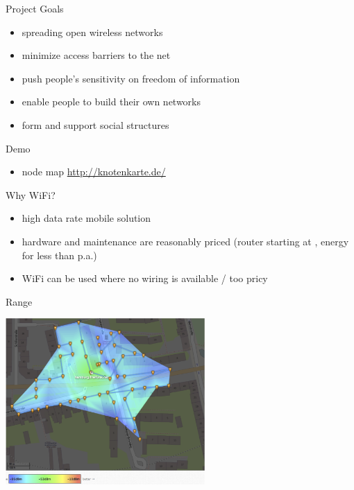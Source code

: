 \documentclass[c]{beamer}
\begin{document}
\begin{frame}{Project Goals}
	\begin{itemize}
		\item spreading open wireless networks
		\item minimize access barriers to the net
		\item push people's sensitivity on freedom of information
		\item enable people to build their own networks
		\item form and support social structures
	\end{itemize}
\end{frame}


\begin{frame}{Demo}
	\begin{itemize}
		\item node map \href{http://knotenkarte.de/}{http://knotenkarte.de/}
	\end{itemize}
\end{frame}



\begin{frame}{Why WiFi?}
	\begin{itemize}
		\item high data rate mobile solution
		\item hardware and maintenance are reasonably priced (router starting at , energy for less than  p.a.)
		\item WiFi can be used where no wiring is available / too pricy
	\end{itemize}
\end{frame}


\begin{frame}{Range}
	\begin{center}
		\includegraphics[height=180pt]{Reichweite_altona001}
	\end{center}
\end{frame}
\end{document}
